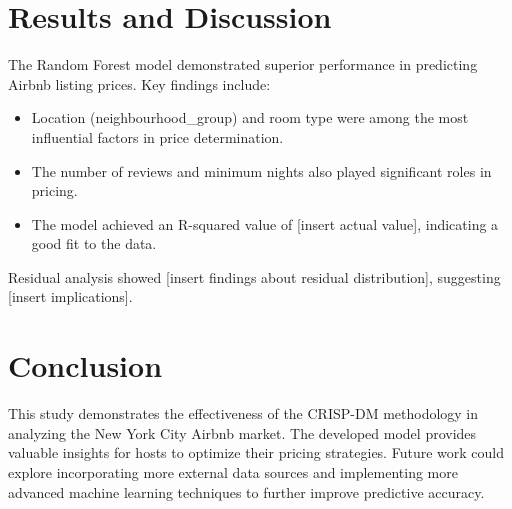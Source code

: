 \documentclass{article}
\begin{document}
\section{Results and Discussion}
The Random Forest model demonstrated superior performance in predicting Airbnb listing prices. Key findings include:
\begin{itemize}
    \item Location (neighbourhood\_group) and room type were among the most influential factors in price determination.
    \item The number of reviews and minimum nights also played significant roles in pricing.
    \item The model achieved an R-squared value of [insert actual value], indicating a good fit to the data.
\end{itemize}

Residual analysis showed [insert findings about residual distribution], suggesting [insert implications].

\section{Conclusion}
This study demonstrates the effectiveness of the CRISP-DM methodology in analyzing the New York City Airbnb market. The developed model provides valuable insights for hosts to optimize their pricing strategies. Future work could explore incorporating more external data sources and implementing more advanced machine learning techniques to further improve predictive accuracy.
\end{document}
